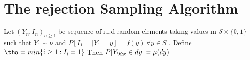 
\section{The rejection Sampling Algorithm}
\label{sec:reject-sampl-algor}

\begin{prop}
  Let $(Y_n,I_n)_{n \geq 1}$ be sequence of i.i.d random elements taking values in $S \times \{0,1\}$ such that
  $Y_1 \sim \nu$ and $P[I_1=|Y_1=y]=f(y)~\forall y \in S$ . 
Define $\tho = min\{i \geq 1 : I_i=1\}$
 Then $P[Y_{\tho} \in dy] = \mu(dy)$ 
\end{prop}

